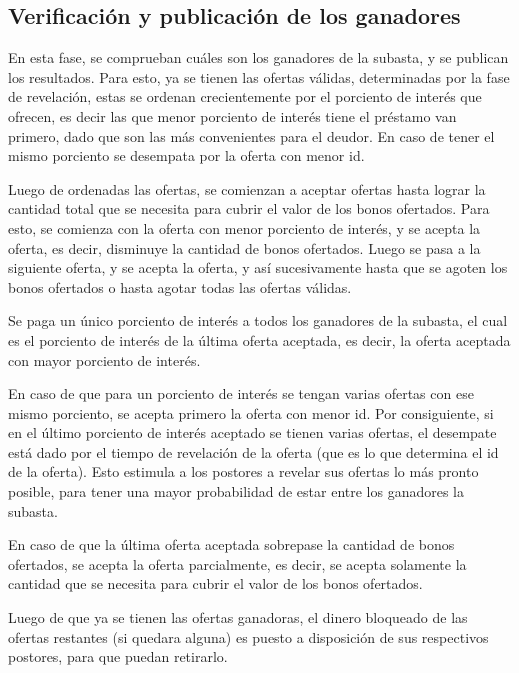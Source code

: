     \subsection{Verificación y publicación de los ganadores}
      En esta fase, se comprueban cuáles son los ganadores de la subasta, y se publican los resultados. Para esto, ya se tienen las ofertas
      válidas, determinadas por la fase de revelación, estas se ordenan crecientemente por el porciento de interés que ofrecen, es decir
      las que menor porciento de interés tiene el préstamo van primero, dado que son las más convenientes para el deudor. En caso de tener
      el mismo porciento se desempata por la oferta con menor id. 

      Luego de ordenadas las ofertas, se comienzan a aceptar ofertas hasta lograr la cantidad total que se necesita para cubrir el valor
      de los bonos ofertados. Para esto, se comienza con la oferta con menor porciento de interés, 
      y se acepta la oferta, es decir, disminuye la cantidad de bonos ofertados. Luego se pasa a la siguiente oferta, y se acepta la oferta, 
      y así sucesivamente hasta que se agoten los bonos ofertados o hasta agotar todas las ofertas válidas.

      Se paga un único porciento de interés a todos los ganadores de la subasta, el cual es el porciento de interés de la última oferta
      aceptada, es decir, la oferta aceptada con mayor porciento de interés.

      En caso de que para un porciento de interés se tengan varias ofertas con ese mismo porciento, se acepta primero la oferta con menor 
      id. Por consiguiente, si en el último porciento de interés aceptado se tienen varias ofertas, el desempate está dado por el tiempo
      de revelación de la oferta (que es lo que determina el id de la oferta). Esto estimula a los postores a revelar sus ofertas lo más
      pronto posible, para tener una mayor probabilidad de estar entre los ganadores la subasta.

      En caso de que la última oferta aceptada sobrepase la cantidad de bonos ofertados, se acepta la oferta parcialmente, es decir, se
      acepta solamente la cantidad que se necesita para cubrir el valor de los bonos ofertados.

      Luego de que ya se tienen las ofertas ganadoras, el dinero bloqueado de las ofertas restantes (si quedara alguna) es puesto a 
      disposición de sus respectivos postores, para que puedan retirarlo.

